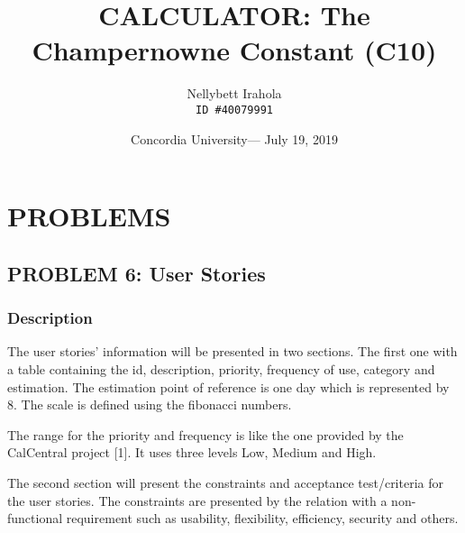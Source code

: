 \documentclass{report}
\title{\vspace{-2cm}CALCULATOR: The Champernowne Constant (C10)} %
\author{Nellybett Irahola\\ \texttt{ID \#40079991}} %
\date{Concordia University--- July 19, 2019} %
\begin{document}
\maketitle %


\tableofcontents{}


\chapter{PROBLEMS}

\section{PROBLEM 6: User Stories}

\subsection{Description}

The user stories' information will be presented in two sections. The first one with a table containing the id, description, priority, frequency of use, category and estimation. The estimation point of reference is one day which is represented by 8. The scale is defined using the fibonacci numbers.

The range for the priority and frequency is like the one provided by the CalCentral project [1]. It uses three levels Low, Medium and High.

The second section will present the constraints and acceptance test/criteria for the user stories. The constraints are presented by the relation with a non-functional requirement such as usability, flexibility, efficiency, security and others.
\end{document}
